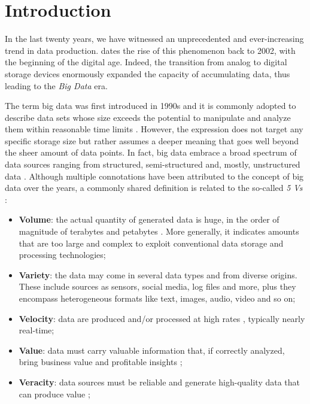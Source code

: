 \chapter{Introduction}


In the last twenty years, we have witnessed an unprecedented and ever-increasing trend in data production. 
 dates the rise of this phenomenon back to 2002, with the beginning of the digital age.
Indeed, the transition from analog to digital storage devices enormously expanded the capacity of accumulating data, thus leading to the \emph{Big Data} era.

The term big data was first introduced in 1990s \cite{16, 17} and it is commonly adopted to describe data sets whose size exceeds the potential to manipulate and analyze them within reasonable time limits \cite{snijders2012big}.
However, the expression does not target any specific storage size but rather assumes a deeper meaning that goes well beyond the sheer amount of data points.
In fact, big data embrace a broad spectrum of data sources ranging from structured, semi-structured and, mostly, unstructured data \cite{dedic2016towards}.
Although multiple connotations have been attributed to the concept of big data over the years, a commonly shared definition is related to the so-called \emph{5 Vs} \cite{3}:

\begin{itemize}
    \item \textbf{Volume}: the actual quantity of generated data is huge, in the order of magnitude of terabytes and petabytes \cite{sagiroglu2013big}. More generally, it indicates amounts that are too large and complex to exploit conventional data storage and processing technologies;
    
    \item \textbf{Variety}: the data may come in several data types and from diverse origins. These include sources as sensors, social media, log files and more, plus they encompass heterogeneous formats like text, images, audio, video and so on; 
    
    \item \textbf{Velocity}: data are produced and/or processed at high rates \cite{kitchin2016makes}, typically nearly real-time;
    
    \item \textbf{Value}: data must carry valuable information that, if correctly analyzed, bring business value and profitable insights \cite{uddin2014seven};
    
    \item \textbf{Veracity}: data sources must be reliable and generate high-quality data that can produce value \cite{onay2018review, 33};


\end{itemize}


